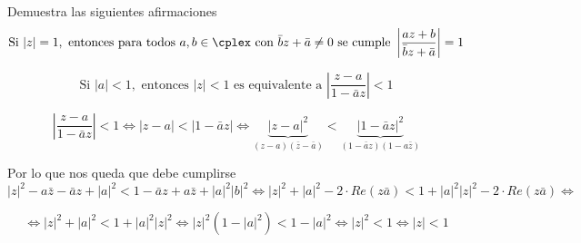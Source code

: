 \begin{problem}[5]
Demuestra las siguientes afirmaciones
\ppart
\[\text{Si } |z|=1, \text{ entonces para todos } a,b \in \cplex \text{ con } \bar{b}z+\bar{a} \neq 0\text{ se cumple } \left| \frac{az+b}{\bar{b}z+\bar{a}}\right| = 1\]

\ppart
\[\text{Si } |a| < 1, \text{ entonces } |z| <1 \text{ es equivalente a } \left| \frac{z-a}{1-\bar{a}z}\right|<1\]

\solution

\spart


\spart

\[\left| \frac{z-a}{1-\bar{a}z}\right|<1 \iff |z-a| < |1-\bar{a}z| \iff \underbrace{|z-a|^2}_{(z-a)(\bar{z}-\bar{a})} < \underbrace{|1-\bar{a}z|^2}_{(1-\bar{a}z)(1-a\bar{z})} \]

Por lo que nos queda que debe cumplirse
\[|z|^2-a\bar{z}-\bar{a}z+|a|^2 < 1-\bar{a}z+a\bar{z}+|a|^2|b|^2 \iff |z|^2+|a|^2-2\cdot Re(z\bar{a}) < 1 + |a|^2|z|^2-2\cdot Re(z\bar{a}) \iff\]

\[\iff |z|^2 + |a|^2 < 1 +|a|^2|z|^2 \iff |z|^2(1-|a|^2) < 1 - |a|^2 \iff |z|^2 < 1 \iff |z| < 1\]

\end{problem}

